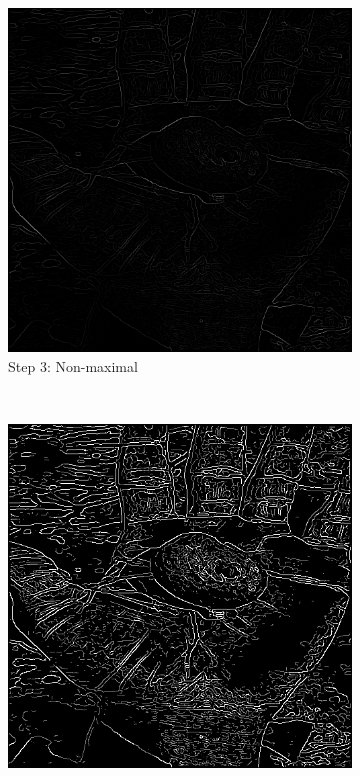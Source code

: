 \documentclass{article}
\begin{document}
\begin{enumerate}[label=(\alph*)]
\begin{figure}[!htb]

        \begin{subfigure}[b]{0.3\textwidth}
            \includegraphics[width=\textwidth]{img/GN.png}
            \caption{Step 3: Non-maximal}
        \end{subfigure}
        ~
        \begin{subfigure}[b]{0.3\textwidth}
            \includegraphics[width=\textwidth]{img/CC.png}

\end{subfigure}
\end{figure}
\end{enumerate}
\end{document}
